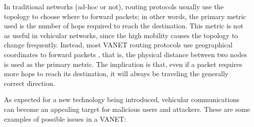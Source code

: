 

In traditional networks (ad-hoc or not), routing protocols usually use the topology to choose where to forward packets; in other words, the primary metric used is the number of hops required to reach the destination.
This metric is not as useful in vehicular networks, since the high mobility causes the topology to change frequently.
Instead, most VANET routing protocols use geographical coordinates to forward packets \cite{saini2015close}, that is, the physical distance between two nodes is used as the primary metric.
The implication is that, even if a packet requires more hops to reach its destination, it will always be traveling the generally correct direction.


As expected for a new technology being introduced, vehicular communications can become an appealing target for malicious users and attackers.
These are some examples of possible issues in a VANET:

